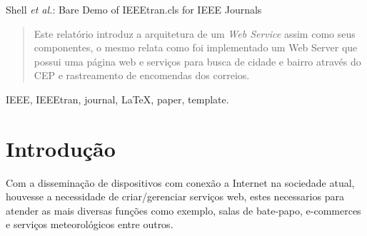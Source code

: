 \documentclass[journal]{IEEEtran}
\begin{document}
%
{Shell \MakeLowercase{\textit{et al.}}: Bare Demo of IEEEtran.cls for IEEE Journals}
% 










\maketitle

\begin{abstract}
  Este relatório introduz a arquitetura de um \textit{Web Service} assim como seus componentes, o mesmo relata como foi implementado um Web Server que possui uma página web e serviços para busca de cidade e bairro através do CEP e rastreamento de encomendas dos correios.
\end{abstract}

\begin{IEEEkeywords}
IEEE, IEEEtran, journal, \LaTeX, paper, template.
\end{IEEEkeywords}


\section{Introdução}
Com a disseminação de dispositivos com conexão a Internet na sociedade atual, houvesse a necessidade de criar/gerenciar serviços web, estes necessarios para atender as mais diversas funções como exemplo, salas de bate-papo, e-commerces e serviços meteorológicos entre outros.
\end{document}
